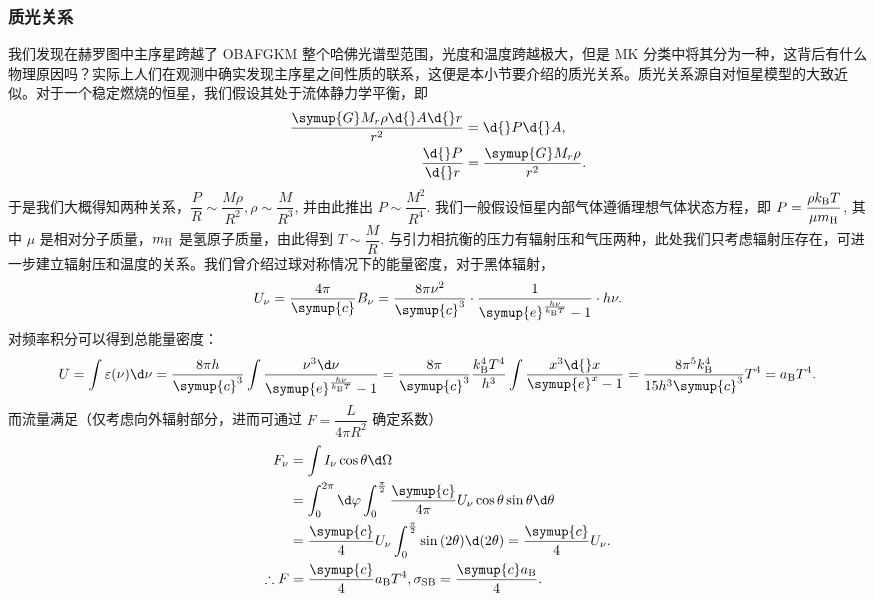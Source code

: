 \documentclass[../天体物理基础.tex]{subfiles}
\begin{document}
\subsubsection{质光关系}
我们发现在赫罗图中主序星跨越了 OBAFGKM 整个哈佛光谱型范围，光度和温度跨越极大，但是 MK 分类中将其分为一种，这背后有什么物理原因吗？实际上人们在观测中确实发现主序星之间性质的联系，这便是本小节要介绍的质光关系。质光关系源自对恒星模型的大致近似。对于一个稳定燃烧的恒星，我们假设其处于流体静力学平衡，即
\begin{align}
\frac{\symup{G}M_{r}\rho\d{}A\d{}r}{r^{2}}&=\d{}P\d{}A,\\
\frac{\d{}P}{\d{}r}&=\frac{\symup{G}M_{r}\rho}{r^{2}}.\label{1.4.4}
\end{align}
于是我们大概得知两种关系，$\dfrac{P}{R}\sim\dfrac{M\rho}{R^{2}},\rho\sim\dfrac{M}{R^{3}}$, 并由此推出 $P\sim\dfrac{M^{2}}{R^{4}}$. 我们一般假设恒星内部气体遵循理想气体状态方程，即 $P=\dfrac{\rho{}k_{\mathrm{B}}T}{\mu m_{\ce{H}}}$, 其中 $\mu$ 是相对分子质量，$m_{\ce{H}}$ 是氢原子质量，由此得到 $T\sim\dfrac{M}{R}$. 与引力相抗衡的压力有辐射压和气压两种，此处我们只考虑辐射压存在，可进一步建立辐射压和温度的关系。我们曾介绍过球对称情况下的能量密度，对于黑体辐射，
\begin{equation}
U_{\nu}=\frac{4\pi{}}{\symup{c}}B_{\nu}=\frac{8\pi\nu^{2}}{\symup{c}^{3}}\cdot\frac{1}{\symup{e}^{\frac{h\nu}{k_{\mathrm{B}}T}}-1}\cdot h\nu.
\end{equation}
对频率积分可以得到总能量密度：
\begin{equation}
U=\int\varepsilon\mleft(\nu\mright)\d\nu=\frac{8\pi h}{\symup{c}^{3}}\int\frac{\nu^{3}\d\nu}{\symup{e}^{\frac{h\nu}{k_{\mathrm{B}}T}}-1}=\frac{8\pi}{\symup{c}^{3}}\frac{k_{\mathrm{B}}^{4}T^{4}}{h^{3}}\int\frac{x^{3}\d{}x}{\symup{e}^{x}-1}=\frac{8\pi^{5}k_{\mathrm{B}}^{4}}{15h^{3}\symup{c}^{3}}T^{4}=a_{\mathrm{B}}T^{4}.
\end{equation}
而流量满足（仅考虑向外辐射部分，进而可通过 $F=\dfrac{L}{4\pi R^{2}}$ 确定系数）
\begin{align}
F_{\nu}&=\int I_{\nu}\cos{\theta}\d\Omega\notag\\
&=\int_{0}^{2\pi}\d\varphi\int_{0}^{\frac{\pi}{2}}\frac{\symup{c}}{4\pi}U_{\nu}\cos{\theta}\sin{\theta}\d\theta\notag\\
&=\frac{\symup{c}}{4}U_{\nu}\int_{0}^{\frac{\pi}{2}}\sin{\mleft(2\theta\mright)}\d\mleft(2\theta\mright)=\frac{\symup{c}}{4}U_{\nu}.\\
\therefore F&=\frac{\symup{c}}{4}a_{\mathrm{B}}T^{4},\sigma_{\mathrm{SB}}=\frac{\symup{c}a_{\mathrm{B}}}{4}.
\end{align}
\end{document}

